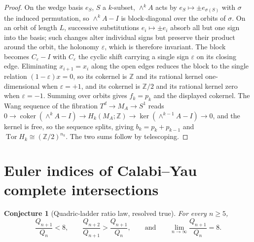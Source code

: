 \documentclass[11pt]{article}
\newtheorem{conjecture}{Conjecture}
\theoremstyle{definition}
\newcommand{\Z}{\mathbb Z}
\providecommand{\Z}{\mathbb Z}
\begin{document}
\begin{proof}
On the wedge basis $e_S$, $S$ a $k$-subset, $\wedge^kA$ acts by $e_S\mapsto\pm e_{\sigma(S)}$ with $\sigma$ the induced permutation, so $\wedge^kA-I$ is block-diagonal over the orbits of $\sigma$.  On an orbit of length $L$, successive substitutions $e_i\mapsto\pm e_i$ absorb all but one sign into the basis; such changes alter individual signs but preserve their product around the orbit, the holonomy $\varepsilon$, which is therefore invariant.  The block becomes $C_\varepsilon-I$ with $C_\varepsilon$ the cyclic shift carrying a single sign $\varepsilon$ on its closing edge.  Eliminating $x_{i+1}=x_i$ along the open edges reduces the block to the single relation $(1-\varepsilon)x=0$, so its cokernel is $\Z$ and its rational kernel one-dimensional when $\varepsilon=+1$, and its cokernel is $\Z/2$ and its rational kernel zero when $\varepsilon=-1$.  Summing over orbits gives $f_k=p_k$ and the displayed cokernel.  The Wang sequence of the fibration $T^d\to M_A\to S^1$ reads $0\to\operatorname{coker}(\wedge^kA-I)\to H_k(M_A;\Z)\to\ker(\wedge^{k-1}A-I)\to0$, and the kernel is free, so the sequence splits, giving $b_k=p_k+p_{k-1}$ and $\operatorname{Tor}H_k\cong(\Z/2)^{n_k}$.  The two sums follow by telescoping.
\end{proof}

\section{Euler indices of Calabi--Yau complete intersections}

\begin{conjecture}[Quadric-ladder ratio law, resolved true]\label{x1}
For every $n\ge5$,
\[
\frac{Q_{n+1}}{Q_n}<8,
\qquad
\frac{Q_{n+2}}{Q_{n+1}}>\frac{Q_{n+1}}{Q_n},
\qquad\text{and}\qquad
\lim_{n\to\infty}\frac{Q_{n+1}}{Q_n}=8.
\]
\end{conjecture}
\end{document}
